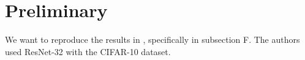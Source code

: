 \chapter{Preliminary}
\label{ch:preliminary}

We want to reproduce the results in \cite{corr/abs-1903-00045}, specifically in
subsection F.
The authors used ResNet-32 with the CIFAR-10 dataset.
